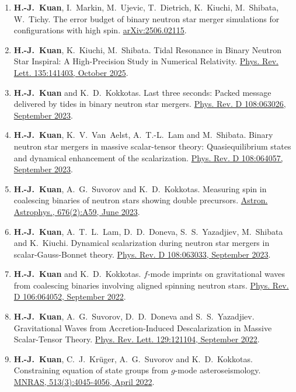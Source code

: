 \documentclass[10pt,floatfix,a4paper]{article}
\begin{document}
\begin{enumerate}
	\item \textbf{H.-J.~Kuan}, I.~Markin, M.~Ujevic, T.~Dietrich, K.~Kiuchi, M.~Shibata, W.~Tichy. The error budget of binary neutron star merger simulations for configurations with high spin. \href{https://arxiv.org/abs/2506.02115}{arXiv:2506.02115}.
	\item \textbf{H.-J.~Kuan}, K.~Kiuchi, M.~Shibata. Tidal Resonance in Binary Neutron Star Inspiral: A High-Precision Study in Numerical Relativity. \href{https://journals.aps.org/prl/abstract/10.1103/j3zk-z17h}{Phys. Rev. Lett. 135:141403, October 2025}.
	\item \textbf{H.-J.~Kuan} and K.~D.~Kokkotas. Last three seconds: Packed message delivered by tides in binary neutron star mergers. \href{https://journals.aps.org/prd/abstract/10.1103/PhysRevD.108.063026}{Phys. Rev. D 108:063026, September 2023}. 
	\item \textbf{H.-J.~Kuan}, K.~V.~Van~Aelst, A.~T.-L.~Lam and M.~Shibata. Binary neutron star mergers in massive scalar-tensor theory: Quasiequilibrium states and dynamical enhancement of the scalarization. \href{https://journals.aps.org/prd/abstract/10.1103/PhysRevD.108.064057}{Phys. Rev. D 108:064057, September 2023}.
	\item \textbf{H.-J.~Kuan}, A.~G.~Suvorov and K.~D.~Kokkotas. Measuring spin in coalescing binaries of neutron stars showing double precursors. \href{	https://doi.org/10.1051/0004-6361/202346658}{Astron. Astrophys., 676(2):A59, June 2023}.
	\item \textbf{H.-J.~Kuan}, A.~T.~L.~Lam, D.~D.~Doneva, S.~S.~Yazadjiev, M.~Shibata and K.~Kiuchi. Dynamical scalarization during neutron star mergers in scalar-Gauss-Bonnet theory. \href{https://journals.aps.org/prd/abstract/10.1103/PhysRevD.108.063033}{Phys. Rev. D 108:063033, September 2023}.
	\item \textbf{H.-J.~Kuan} and K.~D.~Kokkotas. $f$-mode imprints on gravitational waves from coalescing binaries involving aligned spinning neutron stars. \href{https://journals.aps.org/prd/abstract/10.1103/PhysRevD.106.064052}{Phys. Rev. D 106:064052, September 2022}.
	\item \textbf{H.-J.~Kuan}, A.~G.~Suvorov, D.~D.~Doneva and S.~S.~Yazadjiev. Gravitational Waves from Accretion-Induced Descalarization in Massive Scalar-Tensor Theory. \href{https://journals.aps.org/prl/abstract/10.1103/PhysRevLett.129.121104}{Phys. Rev. Lett. 129:121104, September 2022}.
	\item \textbf{H.-J.~Kuan}, C.~J.~Kr{\"u}ger, A.~G.~Suvorov and K.~D.~Kokkotas. Constraining equation of state groups from $g$-mode asteroseismology. \href{https://doi.org/10.1093/mnras/stac1101}{MNRAS, 513(3):4045-4056, April 2022}.

\end{enumerate}
\end{document}
